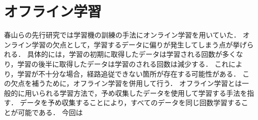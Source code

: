 \newpage
\section{オフライン学習}
春山らの先行研究では学習機の訓練の手法にオンライン学習を用いていた．
オンライン学習の欠点として，学習するデータに偏りが発生してしまう点が挙げられる．
具体的には，学習の初期に取得したデータは学習される回数が多くなり，学習の後半に取得したデータは学習のされる回数は減少する．
これにより，学習が不十分な場合，経路追従できない箇所が存在する可能性がある．
この欠点を補うために，オフライン学習を併用して行う．
オフライン学習とは一般的に用いられる学習方法で，予め収集したデータを使用して学習する手法を指す．
データを予め収集することにより，すべてのデータを同じ回数学習することが可能である．
今回は